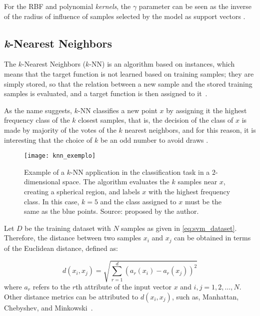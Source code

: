 For the RBF and polynomial \emph{kernels}, the $\gamma$ parameter can be seen as the inverse of the radius of influence of samples selected by the model as support vectors \citep{scikit-learn:11}.



\subsection{\emph{k}-Nearest Neighbors}
\label{sec:classifiers_knn}
The $k$-Nearest Neighbors ($k$-NN) is an algorithm based on instances, which means that the target function is not learned based on training samples; they are simply stored, so that the relation between a new sample and the stored training samples is evaluated, and a target function is then assigned to it~\citep{mitchell:97}.

As the name suggests, $k$-NN classifies a new point $x$ by assigning it the highest frequency class of the $k$ closest samples, that is, the decision of the class of $x$ is made by majority of the votes of the $k$ nearest neighbors, and for this reason, it is interesting that the choice of $k$ be an odd number to avoid draws \citep{duda:12}.

\begin{figure}[ht]
  \centering
  \texttt{[image: knn\_exemplo]}
  \caption[Example of a $k$-NN application in the classification task in a $2$-dimensional space]{Example of a $k$-NN application in the classification task in a $2$-dimensional space. The algorithm evaluates the $k$ samples near $x$, creating a spherical region, and labels $x$ with the highest frequency class. In this case, $k = 5$ and the class assigned to $x$ must be the same as the blue points. Source: proposed by the author.}
  \label{fig:knn_exemplo}
\end{figure}

Let $D$ be the training dataset with $N$ samples as given in \ref{eq:svm_dataset}. Therefore, the distance between two samples $x_i$ and $x_j$ can be obtained in terms of the Euclidean distance, defined as:

\begin{equation}
\label{eq:knn_distance_euclidian}
d(x_i, x_j) = \sqrt{\sum_{r=1}^d (a_r(x_i) - a_r(x_j))^2}
\end{equation}
\noindent where $a_r$ refers to the $r$th attribute of the input vector $x$ and $i, j = 1, 2, \ldots, N$. Other distance metrics can be attributed to $d(x_i, x_j)$, such as, Manhattan, Chebyshev, and Minkowski~\citep{duda:12}.

